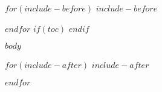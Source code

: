 \documentclass[english]{article}
\title{\mytitle}
\author{\myauthor}
\date{$date$}
\date{\today}
\begin{document}
%
%


$for(include-before)$
$include-before$

$endfor$
$if(toc)$
\tableofcontents
$endif$

\newpage

$body$

$for(include-after)$
$include-after$

$endfor$
\end{document}
